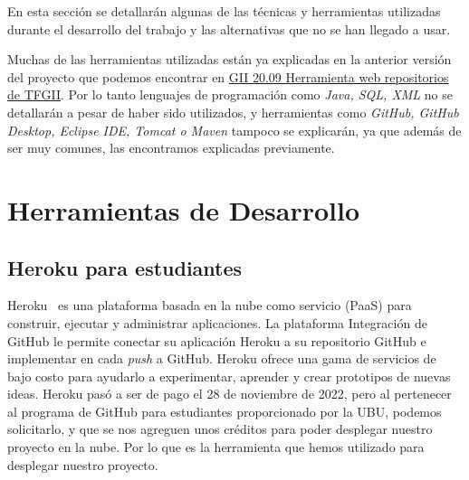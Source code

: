 En esta sección se detallarán algunas de las técnicas y herramientas utilizadas durante el desarrollo del trabajo y las alternativas que no se han llegado a usar.

Muchas de las herramientas utilizadas están ya explicadas en la anterior versión del proyecto que podemos encontrar en \href{https://github.com/dbo1001/Gestor-TFG-2021}{GII 20.09 Herramienta web repositorios de TFGII}. Por lo tanto lenguajes de programación como \emph{Java, SQL, XML} no se detallarán a pesar de haber sido utilizados, y herramientas como \emph{GitHub, GitHub Desktop, Eclipse IDE, Tomcat o Maven} tampoco se explicarán, ya que además de ser muy comunes, las encontramos explicadas previamente.

\section{Herramientas de Desarrollo}

\subsection{Heroku para estudiantes}
Heroku~\cite{heroku_students} es una plataforma basada en la nube como servicio (PaaS) para construir, ejecutar y administrar aplicaciones. 
La plataforma Integración de GitHub le permite conectar su aplicación Heroku a su repositorio GitHub e implementar en cada \emph{push} a GitHub.
Heroku ofrece una gama de servicios de bajo costo para ayudarlo a experimentar, aprender y crear prototipos de nuevas ideas. 
Heroku pasó a ser de pago el 28 de noviembre de 2022, pero al pertenecer al programa de GitHub para estudiantes proporcionado por la UBU, podemos solicitarlo, y que se nos agreguen unos créditos para poder desplegar nuestro proyecto en la nube. Por lo que es la herramienta que hemos utilizado para desplegar nuestro proyecto.

